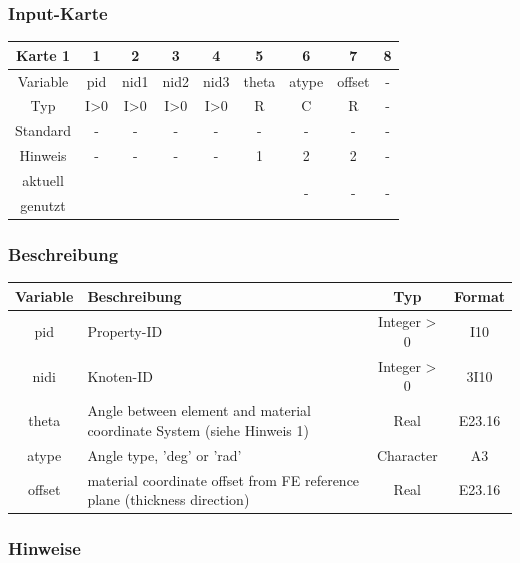 \documentclass[11pt,titlepage,listof=totoc,bibliography=totoc,twoside]{scrreprt}
\begin{document}
{{\subsubsection{Input-Karte}

\begin{table}[htbp]
\centering
\begin{tabularx}{\textwidth}{cCCCCCCCC}
\toprule
Karte 1	& 1		& 2		& 3		& 4		& 5		& 6		& 7		& 8	\\
\midrule
Variable& pid		& nid1		& nid2		& nid3		& theta		& atype		& offset	& -	\\
Typ	& I>0		& I>0		& I>0		& I>0		& R		& C		& R		& -	\\
Standard& -		& -		& -		& -		& -		& -		& -		& -	\\
Hinweis	& -		& -		& -		& -		& 1		& 2		& 2		& -	\\
aktuell	& 	& 	& 	& 	& 	& 	& \multirow{2}{*}{-}	& 	\\
genutzt \\
\bottomrule
\end{tabularx}
\end{table}

\subsubsection{Beschreibung}

\begin{tabularx}{\textwidth}{cXcc}
\toprule
Variable& Beschreibung									& Typ		& Format\\
\midrule
pid	& Property-ID									& Integer > 0	& I10	\\
nidi	& Knoten-ID									& Integer > 0	& 3I10	\\
theta	& Angle between element and material coordinate System (siehe Hinweis 1)	& Real		& E23.16\\
atype	& Angle type, 'deg' or 'rad'							& Character	& A3	\\
offset	& material coordinate offset from FE reference plane (thickness direction)	& Real		& E23.16\\
\bottomrule
\end{tabularx}

\subsubsection{Hinweise}

}}
\end{document}
